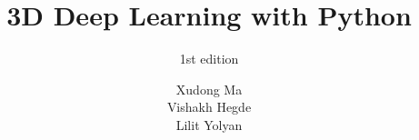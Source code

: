 \documentclass[graybox,envcountchap,sectrefs]{svmono}
\begin{document}
\author{Xudong Ma\\Vishakh Hegde\\Lilit Yolyan}
\title{3D Deep Learning with Python}
\subtitle{1st edition}
\maketitle

\frontmatter
% 
\tableofcontents
\mainmatter



\backmatter
\end{document}
